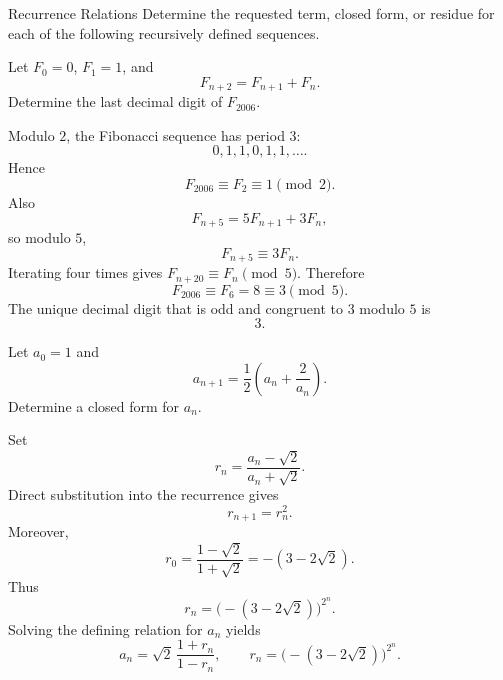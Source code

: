     \begin{expectedproblemgroup}{Recurrence Relations}
        Determine the requested term, closed form, or residue for each of the
        following recursively defined sequences.

        \begin{expectedsubproblem}[2006 VTRMC]
            Let $F_0=0$, $F_1=1$, and
            \[
                F_{n+2}=F_{n+1}+F_n.
            \]
            Determine the last decimal digit of $F_{2006}$.
        \end{expectedsubproblem}

        \begin{expectedsubsolution}
            Modulo $2$, the Fibonacci sequence has period $3$:
            \[
                0,1,1,0,1,1,\ldots.
            \]
            Hence
            \[
                F_{2006}\equiv F_2\equiv1\pmod2.
            \]
            Also
            \[
                F_{n+5}=5F_{n+1}+3F_n,
            \]
            so modulo $5$,
            \[
                F_{n+5}\equiv3F_n.
            \]
            Iterating four times gives $F_{n+20}\equiv F_n\pmod5$. Therefore
            \[
                F_{2006}\equiv F_6=8\equiv3\pmod5.
            \]
            The unique decimal digit that is odd and congruent to $3$ modulo $5$ is
            \[
                \boxed{3}.
            \]
        \end{expectedsubsolution}


        \begin{expectedsubproblem}
            Let $a_0=1$ and
            \[
                a_{n+1}
                =
                \frac12\left(a_n+\frac{2}{a_n}\right).
            \]
            Determine a closed form for $a_n$.
        \end{expectedsubproblem}

        \begin{expectedsubsolution}
            Set
            \[
                r_n=\frac{a_n-\sqrt2}{a_n+\sqrt2}.
            \]
            Direct substitution into the recurrence gives
            \[
                r_{n+1}=r_n^2.
            \]
            Moreover,
            \[
                r_0
                =
                \frac{1-\sqrt2}{1+\sqrt2}
                =
                -(3-2\sqrt2).
            \]
            Thus
            \[
                r_n=\bigl(-(3-2\sqrt2)\bigr)^{2^n}.
            \]
            Solving the defining relation for $a_n$ yields
            \[
                \boxed{
                    a_n
                    =
                    \sqrt2\,
                    \frac{1+r_n}{1-r_n},
                    \qquad
                    r_n=\bigl(-(3-2\sqrt2)\bigr)^{2^n}
                }.
            \]
        \end{expectedsubsolution}



\end{expectedproblemgroup}
